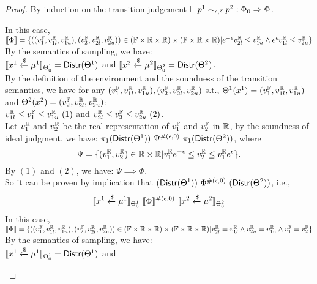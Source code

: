 \documentclass[a4paper,11pt]{article}
\begin{document}
\begin{proof}
By induction on the transition judgement $\vdash p^1	
\sim_{\epsilon, \delta} 
p^2 :
\Phi_0 \Rightarrow \Phi $.
\begin{itemize}
	In this case, 
	$\llbracket \Phi \rrbracket = 
	\{((v^{\mathbb{F}}_1, v^{\mathbb{R}}_{1l}, v^{\mathbb{R}}_{1u}), (v^{\mathbb{F}}_2, v^{\mathbb{R}}_{2l}, v^{\mathbb{R}}_{2u})) 
	\in (\mathbb{F} \times \mathbb{R} \times \mathbb{R}) \times (\mathbb{F} \times \mathbb{R} \times \mathbb{R})
	|
	e^{-\epsilon} v^{\mathbb{R}}_{2l} \leq v^{\mathbb{R}}_{1u}
	\land
	e^{\epsilon} v^{\mathbb{R}}_{1l} \leq v^{\mathbb{R}}_{2u}
	\}$
	\\
	By the semantics of sampling, we have:\\
	$\llbracket x^1 \xleftarrow{\$} \mu^1 \rrbracket_{\Theta^1_0} = \mathsf{Distr}(\Theta^1)$ and 
	$\llbracket x^2 \xleftarrow{\$} \mu^2 \rrbracket_{\Theta^2_0} = \mathsf{Distr}(\Theta^2)$. \\
	By the definition of the environment and the soundness of the transition semantics, we have for any $(v^{\mathbb{F}}_1, v^{\mathbb{R}}_{1l}, v^{\mathbb{R}}_{1u}), (v^{\mathbb{F}}_2, v^{\mathbb{R}}_{2l}, v^{\mathbb{R}}_{2u})$ s.t.,
	$\Theta^1 (x^1) = (v^{\mathbb{F}}_1, v^{\mathbb{R}}_{1l}, v^{\mathbb{R}}_{1u})$
	and
	$\Theta^2 (x^2) = (v^{\mathbb{F}}_2, v^{\mathbb{R}}_{2l}, v^{\mathbb{R}}_{2u})$:
	\\
	$ v^{\mathbb{R}}_{1l} \leq v^{\mathbb{F}}_1 \leq v^{\mathbb{R}}_{1u} ~ (1)$ 
	and
	$ v^{\mathbb{R}}_{2l} \leq v^{\mathbb{F}}_2 \leq v^{\mathbb{R}}_{2u} ~ (2)$.
	\\
	Let $v^{\mathbb{R}}_1$ and $v^{\mathbb{R}}_2$ be the real representation of $v^{\mathbb{F}}_1$ and $v^{\mathbb{F}}_2$ in $\mathbb{R}$, by the soundness of ideal judgment, we have:
	$\pi_1 (\mathsf{Distr}(\Theta^1)) ~ \Psi^{\#(\epsilon, 0)} ~ \pi_1 (\mathsf{Distr}(\Theta^2))$, where
	\[
		\Psi = \{(v^{\mathbb{R}}_1, v^{\mathbb{R}}_2) \in \mathbb{R} \times \mathbb{R}
		| 
		v^{\mathbb{R}}_1 e^{-\epsilon} 
		\leq v^{\mathbb{R}}_2
		\leq v^{\mathbb{R}}_1 e^{\epsilon} \}.
	\]
	By $(1)$ and $(2)$, we have:
	$\Psi \implies \Phi$.
	\\
	So it can be proven by implication that 
	$(\mathsf{Distr}(\Theta^1)) ~ \Phi^{\#(\epsilon, 0)} ~ (\mathsf{Distr}(\Theta^2))$, i.e., 
	$$
	\llbracket x^1 \xleftarrow{\$} \mu^1 \rrbracket_{\Theta^1_0} 
		~ \llbracket \Phi \rrbracket^{\#(\epsilon, 0)} ~
		\llbracket x^2 \xleftarrow{\$} \mu^2 \rrbracket_{\Theta^2_0}
	$$
	In this case, 
	$\llbracket \Phi \rrbracket = 
	\{((v^{\mathbb{F}}_1, v^{\mathbb{R}}_{1l}, v^{\mathbb{R}}_{1u}), (v^{\mathbb{F}}_2, v^{\mathbb{R}}_{2l}, v^{\mathbb{R}}_{2u})) 
	\in (\mathbb{F} \times \mathbb{R} \times \mathbb{R}) \times (\mathbb{F} \times \mathbb{R} \times \mathbb{R})
	|
	v^{\mathbb{R}}_{2l} = v^{\mathbb{R}}_{1l}
	\land
	v^{\mathbb{R}}_{2u} = v^{\mathbb{R}}_{1u}
	\land
	v^{\mathbb{F}}_1 = v^{\mathbb{F}}_2
	\}$
	\\
	By the semantics of sampling, we have:\\
	$\llbracket x^1 \xleftarrow{\$} \mu^1 \rrbracket_{\Theta^1_0} = \mathsf{Distr}(\Theta^1)$ and 

\end{itemize}
\end{proof}
\end{document}
